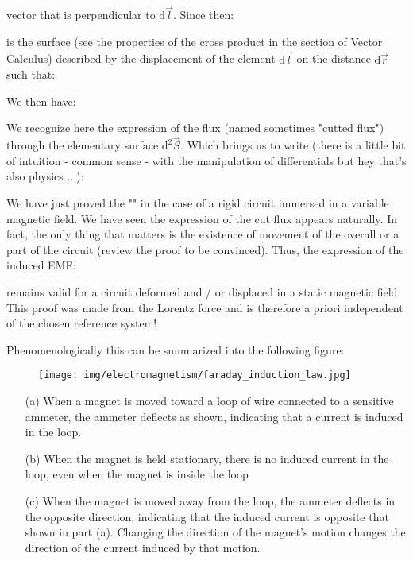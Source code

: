 	vector that is perpendicular to $\mathrm{d}\vec{l}$. Since then:
	
	is the surface (see the properties of the cross product in the section of Vector Calculus) described by the displacement of the element $\mathrm{d}\vec{l}$ on the distance $\mathrm{d}\vec{r}$ such that:
	
	We then have:
	
	We recognize here the expression of the flux (named sometimes "cutted flux") through the elementary surface $\mathrm{d}^2 \vec{S}$. Which brings us to write (there is a little bit of intuition - common sense - with the manipulation of differentials but hey that's also physics ...):
	
	We have just proved the "\label{Faraday's law of induction}" in the case of a rigid circuit immersed in a variable magnetic field. We have seen the expression of the cut flux appears naturally. In fact, the only thing that matters is the existence of movement of the overall or a part of the circuit (review the proof to be convinced). Thus, the expression of the induced EMF:
	
	remains valid for a circuit deformed and / or displaced in a static magnetic field. This proof was made from the Lorentz force and is therefore a priori independent of the chosen reference system!
	
	Phenomenologically this can be summarized into the following figure:
	\begin{figure}[H]
		\centering
		\texttt{[image: img/electromagnetism/faraday\_induction\_law.jpg]}
	\end{figure}
	\begin{enumerate}
		\item[(a)] When a magnet is moved toward a loop of wire connected to a sensitive ammeter, the ammeter deflects as shown, indicating that a current is induced in the loop. 
		
		\item[(b)] When the magnet is held stationary, there is no induced current in the loop, even when the magnet is inside the loop
		
		\item[(c)] When the magnet is moved away from the loop, the ammeter deflects in the opposite direction, indicating that the induced current is opposite that shown in part (a). Changing the direction of the magnet's motion changes the direction of the current induced by that motion.
	\end{enumerate}
	
